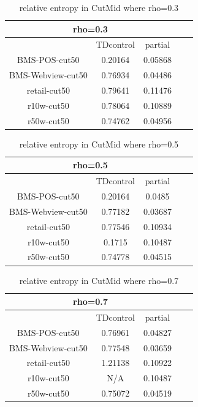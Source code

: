 \documentclass{article}
\begin{document}
\begin{table}
\begin{tabular}{|c|c|c|c|c|}
  \hline
    \multicolumn{3}{|c|}{rho=0.3}\\
  \hline
   & TDcontrol & partial \\\hline
  BMS-POS-cut50 &0.20164 & 0.05868 \\\hline
  BMS-Webview-cut50 & 0.76934 & 0.04486 \\\hline
  retail-cut50& 0.79641 & 0.11476 \\\hline
  r10w-cut50 &0.78064 & 0.10889\\\hline
  r50w-cut50 & 0.74762& 0.04956 \\
  \hline
\end{tabular}
\caption{ relative entropy in CutMid where rho=0.3}
\end{table}

\begin{table}
\begin{tabular}{|c|c|c|c|c|}
  \hline
    \multicolumn{3}{|c|}{rho=0.5}\\
  \hline
   & TDcontrol & partial \\\hline
  BMS-POS-cut50 &0.20164 &0.0485 \\\hline
  BMS-Webview-cut50 & 0.77182 & 0.03687 \\\hline
  retail-cut50& 0.77546 & 0.10934 \\\hline
  r10w-cut50 &0.1715 & 0.10487\\\hline
  r50w-cut50 & 0.74778& 0.04515 \\
  \hline
\end{tabular}
\caption{ relative entropy in CutMid where rho=0.5}
\end{table}


\begin{table}
\begin{tabular}{|c|c|c|c|c|}
  \hline
    \multicolumn{3}{|c|}{rho=0.7}\\
  \hline
   & TDcontrol & partial \\\hline
  BMS-POS-cut50 &0.76961 &0.04827 \\\hline
  BMS-Webview-cut50 & 0.77548 &0.03659 \\\hline
  retail-cut50& 1.21138 &0.10922 \\\hline
  r10w-cut50 &  N/A &0.10487\\\hline
  r50w-cut50 & 0.75072&0.04519 \\
  \hline
\end{tabular}
\caption{ relative entropy in CutMid where rho=0.7}
\end{table}
\end{document}
